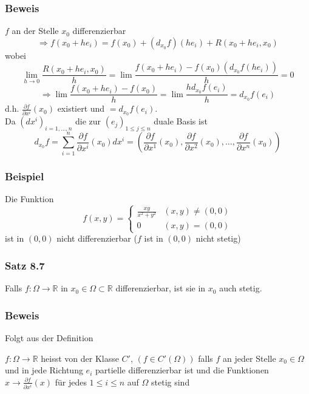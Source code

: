 \subsubsection*{Beweis}
$f$ an der Stelle $x_0$ differenzierbar \[\Rightarrow f\left( {{x_0} + h{e_i}} \right) = f\left( {{x_0}} \right) + \left( {{d_{{x_0}}}f} \right)\left( {h{e_i}} \right) + R\left( {{x_0} + h{e_i},{x_0}} \right)\] wobei \[\mathop {\lim }\limits_{h \to 0} \frac{{R\left( {{x_0} + h{e_i},{x_0}} \right)}}{h} = \lim \frac{{f\left( {{x_0} + h{e_i}} \right) - f\left( {{x_0}} \right)\left( {{d_{{x_0}}}f\left( {h{e_i}} \right)} \right)}}{h} = 0\] \[ \Rightarrow \lim \frac{{f\left( {{x_0} + h{e_i}} \right) - f\left( {{x_0}} \right)}}{h} = \lim \frac{{h{d_{{x_0}}}f\left( {{e_i}} \right)}}{h} = {d_{{x_0}}}f\left( {{e_i}} \right)\] d.h. $\frac{\partial f}{\partial x^i}\left( x_0\right)$ existiert und $=d_{x_0}f\left( e_i\right)$. \\

Da $\left( dx^i\right)_{i=1,\dots,n}$ die zur $\left( e_j\right)_{1\leq j\leq n}$ duale Basis ist \[{d_{{x_0}}}f = \sum\limits_{i = 1}^n {\frac{{\partial f}}{{\partial {x^i}}}\left( {{x_0}} \right)d{x^i} = \left( {\frac{{\partial f}}{{\partial {x^1}}}\left( {{x_0}} \right),\frac{{\partial f}}{{\partial {x^2}}}\left( {{x_0}} \right), \ldots ,\frac{{\partial f}}{{\partial {x^n}}}\left( {{x_0}} \right)} \right)} \]

\subsubsection*{Beispiel}
Die Funktion \[f\left( {x,y} \right) = \left\{ {\begin{array}{*{20}{c}}
{\frac{{xy}}{{{x^2} + {y^2}}}}&{\left( {x,y} \right)\not  = \left( {0,0} \right)}\\
0&{\left( {x,y} \right) = \left( {0,0} \right)}
\end{array}} \right.\] ist in $\left( 0,0\right)$ nicht differenzierbar ($f$ ist  in $\left( 0,0\right)$ nicht stetig)

\subsubsection*{Satz 8.7}
Falls $f:\Omega\rightarrow\mathbb{R}$ in $x_0\in\Omega\subset\mathbb{R}$ differenzierbar, ist sie in $x_0$ auch stetig.

\subsubsection*{Beweis}
Folgt aus der Definition
\begin{definition}{8.8}
$f:\Omega\rightarrow\mathbb{R}$ heisst von der Klasse $C'$, $\left( f\in C'\left(\Omega\right)\right)$ falls $f$ an jeder Stelle $x_0\in\Omega$ und in jede Richtung $e_i$ partielle differenzierbar ist und die Funktionen $x\rightarrow\frac{\partial f}{\partial x^i}\left(x\right)$ für jedes $1\leq i\leq n$ auf $\Omega$ stetig sind
\end{definition}
